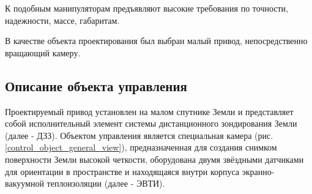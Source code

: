 К подобным манипуляторам предъявляют высокие требования по точности,
надежности, массе, габаритам.

В качестве объекта проектирования был выбран малый привод, непосредственно вращающий камеру.

\newpage
\subsection{Описание объекта управления}
Проектируемый привод установлен на малом спутнике Земли и представляет собой
исполнительный элемент системы дистанционного зондирования Земли (далее - ДЗЗ).
Объектом управления является специальная камера (рис. \ref{control_object_general_view}),
предназначенная для создания снимком поверхности Земли высокой четкости,
оборудована двумя звёздными датчиками для ориентации в пространстве и
находящаяся внутри корпуса экранно-вакуумной теплоизоляции (далее - ЭВТИ).

